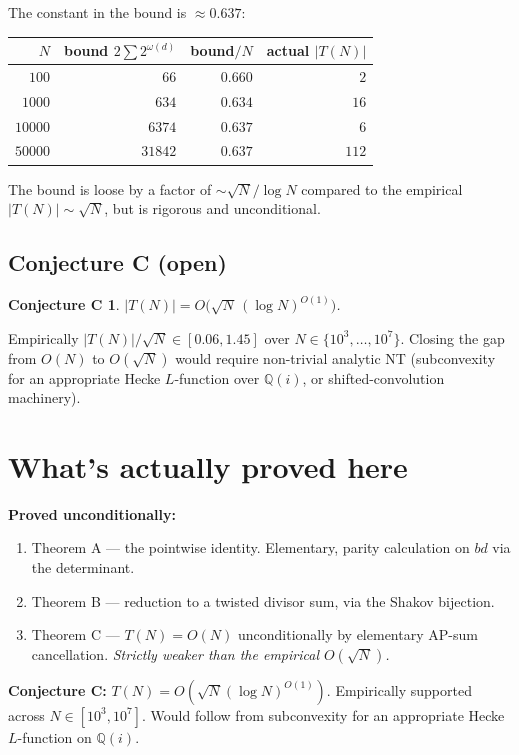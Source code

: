 \documentclass[11pt]{article}
\newtheorem*{conjectureC}{Conjecture C}
\begin{document}
The constant in the bound is $\approx 0.637$:

\begin{center}
\begin{tabular}{r|r|r|r}
$N$ & bound $2 \sum 2^{\omega(d)}$ & bound$/N$ & actual $|T(N)|$ \\ \hline
$100$ & $66$ & $0.660$ & $2$ \\
$1000$ & $634$ & $0.634$ & $16$ \\
$10000$ & $6374$ & $0.637$ & $6$ \\
$50000$ & $31842$ & $0.637$ & $112$
\end{tabular}
\end{center}

The bound is loose by a factor of $\sim \sqrt N / \log N$ compared to the
empirical $|T(N)| \sim \sqrt N$, but is rigorous and unconditional.

\subsection*{Conjecture C (open)}

\begin{conjectureC}
$|T(N)| = O\bigl(\sqrt N\,(\log N)^{O(1)}\bigr)$.
\end{conjectureC}

Empirically $|T(N)|/\sqrt N \in [0.06, 1.45]$ over
$N \in \{10^3, \dots, 10^7\}$. Closing the gap from $O(N)$ to $O(\sqrt N)$
would require non-trivial analytic NT (subconvexity for an appropriate Hecke
$L$-function over $\mathbb{Q}(i)$, or shifted-convolution machinery).

\section{What's actually proved here}

\textbf{Proved unconditionally:}
\begin{enumerate}
\item Theorem A --- the pointwise identity. Elementary, parity calculation on
$bd$ via the determinant.
\item Theorem B --- reduction to a twisted divisor sum, via the Shakov bijection.
\item Theorem C --- $T(N) = O(N)$ unconditionally by elementary AP-sum
cancellation. \emph{Strictly weaker than the empirical $O(\sqrt N)$.}
\end{enumerate}

\textbf{Conjecture C:} $T(N) = O(\sqrt N (\log N)^{O(1)})$. Empirically supported
across $N \in [10^3, 10^7]$. Would follow from subconvexity for an appropriate
Hecke $L$-function on $\mathbb{Q}(i)$.
\end{document}
